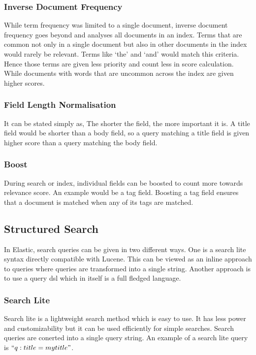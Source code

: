 \documentclass[12pt]{article}
\begin{document}
			\subsubsection{Inverse Document Frequency}
				While term frequency was limited to a single document, inverse document frequency goes beyond and analyses all documents in an index. Terms that are common not only in a single document but also in other documents in the index would rarely be relevant. Terms like `the' and `and' would match this criteria. Hence those terms are given less priority and count less in score calculation. While documents with words that are uncommon across the index are given higher scores.

			\subsubsection{Field Length Normalisation}
				It can be stated simply as, The shorter the field, the more important it is. A title field would be shorter than a body field, so a query matching a title field is given higher score than a query matching the body field. 

			\subsubsection{Boost}
				During search or index, individual fields can be boosted to count more towards relevance score. An example would be a tag field. Boosting a tag field ensures that a document is matched when any of its tags are matched. 

		\subsection{Structured Search}
			In Elastic, search queries can be given in two different ways. One is a search lite syntax directly compatible with Lucene. This can be viewed as an inline approach to queries where queries are transformed into a single string. Another approach is to use a query \ac{dsl} which in itself is a full fledged language.

			\subsubsection{Search Lite}
				Search lite is a lightweight search method which is easy to use. It has less power and customizability but it can be used efficiently for simple searches. Search queries are conerted into a single query string. An example of a search lite query is \(``q:title=my title"\).
\end{document}
